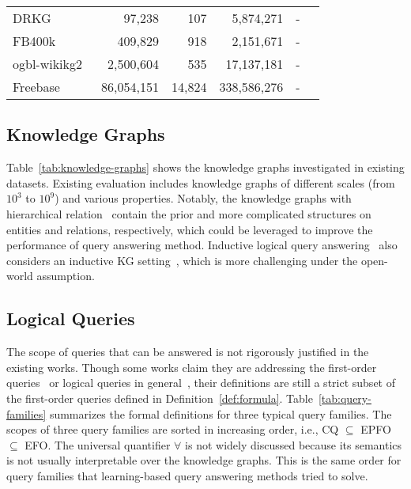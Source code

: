 \documentclass[11pt]{article}
\begin{document}
\begin{table}[t]
\begin{tabular}{lrrrrr}
		DRKG~\cite{Zhang2021Drugrepurposing} & 97,238 & 107 & 5,874,271 & - & \cite{Choudhary2021ProbabilisticEntity} \\
        FB400k~\cite{Talmor2018WebKnowledgeBase,Bollacker2008Freebasecollaboratively} & 409,829 & 918 & 2,151,671 & - & \cite{Ren2022SMOREKnowledgea} \\
		ogbl-wikikg2~\cite{Hu2020OpenGraph} & 2,500,604 & 535 & 17,137,181 & - & \cite{Ren2022SMOREKnowledgea,Galkin2022InductiveLogical} \\
		Freebase~\cite{Bollacker2008Freebasecollaboratively} & 86,054,151 & 14,824 & 338,586,276 & - & \cite{Ren2022SMOREKnowledgea} \\
		\bottomrule
	\end{tabular}
\end{table}

\subsection{Knowledge Graphs} Table~\ref{tab:knowledge-graphs} shows the knowledge graphs investigated in existing datasets. Existing evaluation includes knowledge graphs of different scales (from $10^3$ to $10^9$) and various properties. Notably, the knowledge graphs with hierarchical relation~\cite{Miller1995WordNetlexical,Auer2007DBpediaNucleus} contain the prior and more complicated structures on entities and relations, respectively, which could be leveraged to improve the performance of query answering method.
Inductive logical query answering~\cite{Galkin2022InductiveLogical} also considers an inductive
KG setting~\cite{Teru2020InductiveRelation}, which is more challenging under the open-world assumption.
 
\subsection{Logical Queries} The scope of queries that can be answered is not rigorously justified in the existing works. Though some works claim they are addressing the first-order queries~\cite{Ren2020BetaEmbeddings} or logical queries in general~\cite{Liu2021NeuralAnsweringLogical}, their definitions are still a strict subset of the first-order queries defined in Definition~\ref{def:formula}.
Table~\ref{tab:query-families} summarizes the formal definitions for three typical query families. The scopes of three query families are sorted in increasing order, i.e., CQ $\subseteq$ EPFO $\subseteq$ EFO. The universal quantifier $\forall$ is not widely discussed because its semantics is not usually interpretable over the knowledge graphs. This is the same order for query families that learning-based query answering methods tried to solve.
\end{document}
